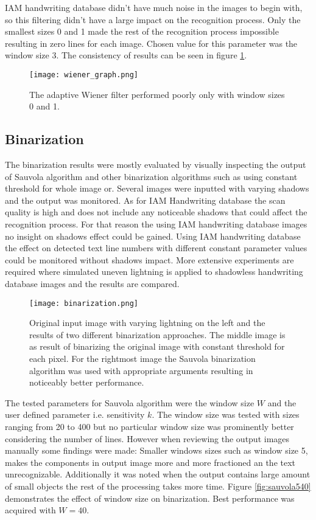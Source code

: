 \documentclass{article}
\begin{document}
    IAM handwriting database didn't have much noise in the images to begin with, so this filtering didn't have a large impact on the recognition process. Only the smallest sizes 0 and 1 made the rest of the recognition process impossible resulting in zero lines for each image. Chosen value for this parameter was the window size 3. The consistency of results can be seen in figure \ref{fig:wienertest}.

    \begin{figure}[!ht]
      \centering
      \texttt{[image: wiener\_graph.png]}
      \caption{The adaptive Wiener filter performed poorly only with window sizes 0 and 1.
      \label{fig:wienertest}}
    \end{figure}

  \subsection{Binarization}
    The binarization results were mostly evaluated by visually inspecting the output of Sauvola algorithm and other binarization algorithms such as using constant threshold for whole image or. Several images were inputted with varying shadows and the output was monitored. As for IAM Handwriting database the scan quality is high and does not include any noticeable shadows that could affect the recognition process. For that reason the using IAM handwriting database images no insight on shadows effect could be gained. Using IAM handwriting database the effect on detected text line numbers with different constant parameter values could be monitored without shadows impact. More extensive experiments are required where simulated uneven lightning is applied to shadowless handwriting database images and the results are compared.

    \begin{figure}[!ht]
      \centering
      \texttt{[image: binarization.png]}
      \caption{Original input image with varying lightning on the left and the results of two different binarization approaches. The middle image is as result of binarizing the original image with constant threshold for each pixel. For the rightmost image the Sauvola binarization algorithm was used with appropriate arguments resulting in noticeably better performance. \label{fig:binarization}}
    \end{figure}


    The tested parameters for Sauvola algorithm were the window size $W$ and the user defined parameter i.e. sensitivity $k$. The window size was tested with sizes ranging from 20 to 400 but no particular window size was prominently better considering the number of lines. However when reviewing the output images manually some findings were made: Smaller windows sizes such as window size 5, makes the components in output image more and more fractioned an the text unrecognizable. Additionally it was noted when the output contains large amount of small objects the rest of the processing takes more time. Figure \ref{fig:sauvola540} demonstrates the effect of window size on binarization. Best performance was acquired with $W = 40$.
\end{document}

